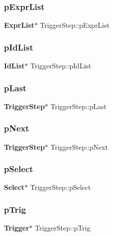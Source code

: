\mbox{\label{struct_trigger_step_a607602af65ecf6c7e6cac4ea8532ac1d}} 
\subsubsection{pExprList}
{\footnotesize\ttfamily \textbf{ Expr\+List}$\ast$ Trigger\+Step\+::p\+Expr\+List}

\mbox{\label{struct_trigger_step_a6b91bf578544104f8bd4bd5b958ddd8c}} 
\subsubsection{pIdList}
{\footnotesize\ttfamily \textbf{ Id\+List}$\ast$ Trigger\+Step\+::p\+Id\+List}

\mbox{\label{struct_trigger_step_a0aae9ea7f436881c0e9e614476a69584}} 
\subsubsection{pLast}
{\footnotesize\ttfamily \textbf{ Trigger\+Step}$\ast$ Trigger\+Step\+::p\+Last}

\mbox{\label{struct_trigger_step_a0757a0d22dbe2f7f57706014dd35759b}} 
\subsubsection{pNext}
{\footnotesize\ttfamily \textbf{ Trigger\+Step}$\ast$ Trigger\+Step\+::p\+Next}

\mbox{\label{struct_trigger_step_a90bf3353653cedf364a7fb2eb89a19c4}} 
\subsubsection{pSelect}
{\footnotesize\ttfamily \textbf{ Select}$\ast$ Trigger\+Step\+::p\+Select}

\mbox{\label{struct_trigger_step_a70671e85796776db06c732ab6ae4ae0d}} 
\subsubsection{pTrig}
{\footnotesize\ttfamily \textbf{ Trigger}$\ast$ Trigger\+Step\+::p\+Trig}

